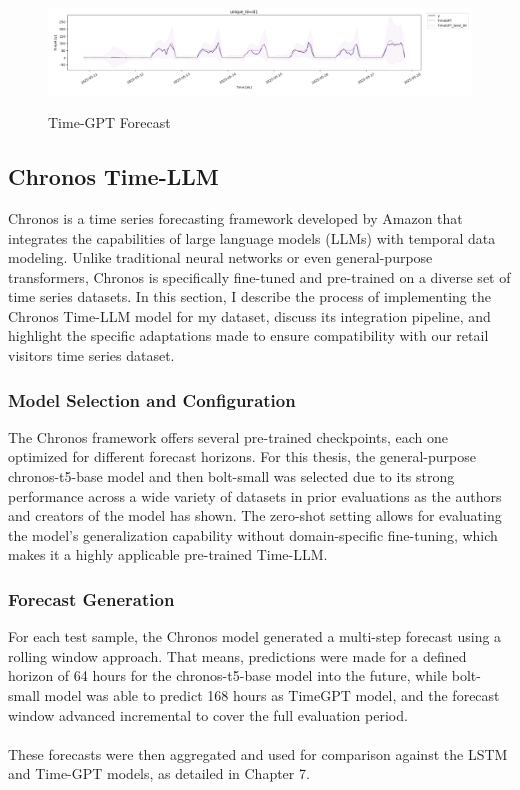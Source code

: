 \documentclass{article}
\begin{document}
\begin{figure}[h]
\includegraphics[scale=0.36]{images/timegpt_forecast.png}
    \label{fig:mesh1}
    \caption{Time-GPT Forecast}
\end{figure}


\subsection{Chronos Time-LLM}
Chronos is a time series forecasting framework developed by Amazon that integrates the capabilities of large language models (LLMs) with temporal data modeling. Unlike traditional neural networks or even general-purpose transformers, Chronos is specifically fine-tuned and pre-trained on a diverse set of time series datasets. In this section, I describe the process of implementing the Chronos Time-LLM model for my dataset, discuss its integration pipeline, and highlight the specific adaptations made to ensure compatibility with our retail visitors time series dataset.\\

\subsubsection{Model Selection and Configuration}
The Chronos framework offers several pre-trained checkpoints, each one optimized for different forecast horizons. For this thesis, the general-purpose chronos-t5-base model and then bolt-small was selected due to its strong performance across a wide variety of datasets in prior evaluations as the authors and creators of the model has shown. The zero-shot setting allows for evaluating the model’s generalization capability without domain-specific fine-tuning, which makes it a highly applicable pre-trained Time-LLM.

\subsubsection{Forecast Generation}
For each test sample, the Chronos model generated a multi-step forecast using a rolling window approach. That means, predictions were made for a defined horizon of 64 hours for the chronos-t5-base model  into the future, while bolt-small model was able to predict 168 hours as TimeGPT model, and the forecast window advanced incremental to cover the full evaluation period.\\
\\
These forecasts were then aggregated and used for comparison against the LSTM and Time-GPT models, as detailed in Chapter 7.
\end{document}
